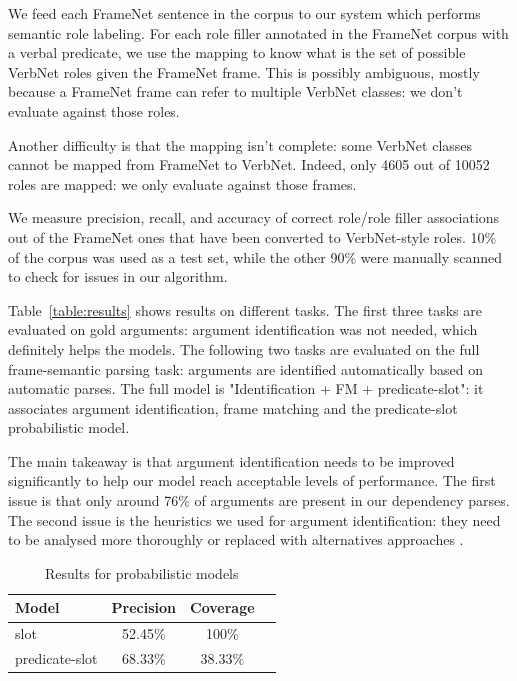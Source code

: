 We feed each FrameNet sentence in the corpus to our system which performs
semantic role labeling. For each role filler annotated
in the FrameNet corpus with a verbal predicate, we use the mapping to know what
is the set of possible VerbNet roles given the FrameNet frame. This is possibly
ambiguous, mostly because a FrameNet frame can refer to multiple VerbNet
classes: we don't evaluate against those roles.

Another difficulty is that the mapping isn't complete: some VerbNet classes
cannot be mapped from FrameNet to VerbNet. Indeed, only 4605 out of 10052 roles
are mapped: we only evaluate against those frames.

We measure precision, recall, and accuracy of correct role/role filler
associations out of the FrameNet ones that have been converted to VerbNet-style
roles. 10\% of the corpus was used as a test set, while the other 90\% were
manually scanned to check for issues in our algorithm.

Table~\ref{table:results} shows results on different tasks. The first three
tasks are evaluated on gold arguments: argument identification was not needed, which
definitely helps the models. The following two tasks are evaluated on the full
frame-semantic parsing task: arguments are identified automatically based on
automatic parses. The full model is "Identification + FM + predicate-slot": it
associates argument identification, frame matching and the predicate-slot
probabilistic model.

The main takeaway is that argument identification needs to be improved
significantly to help our model reach acceptable levels of performance. The
first issue is that only around 76\% of arguments are present in our dependency
parses. The second issue is the heuristics we used for argument identification:
they need to be analysed more thoroughly or replaced with alternatives
approaches \citep{abend2009unsupervised}.

\begin{table}[ht]
    \centering
    \begin{tabular}{lccc}
        \toprule
        Model          & Precision & Coverage \\
        \midrule
        slot           & 52.45\% & 100\% \\
        predicate-slot & 68.33\% & 38.33\% \\
        \bottomrule
    \end{tabular}
    \caption{\protect\centering\label{table:probabilisticresults}Results for probabilistic models}
\end{table}

